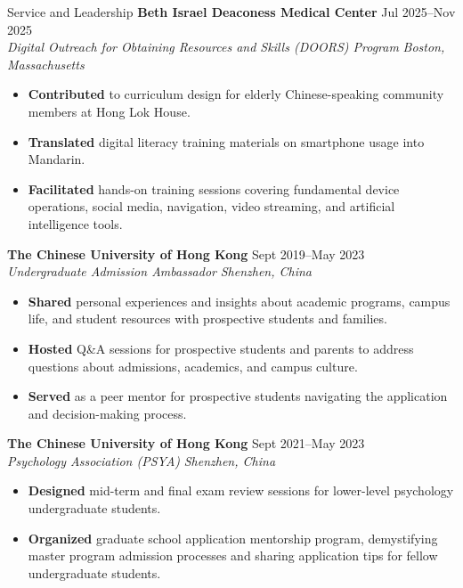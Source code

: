\documentclass{resume} %
\begin{document}
\begin{rSection}{Service and Leadership}
\textbf{Beth Israel Deaconess Medical Center} \hfill {Jul 2025--Nov 2025} \\
\textit{Digital Outreach for Obtaining Resources and Skills (DOORS) Program} \hfill{\textit{Boston, Massachusetts}}
\begin{itemize}
    \itemsep -5pt {}
    \item \textbf{Contributed} to curriculum design for elderly Chinese-speaking community members at Hong Lok House. 
    \item \textbf{Translated} digital literacy training materials on smartphone usage into Mandarin.
    \item \textbf{Facilitated} hands-on training sessions covering fundamental device operations, social media, navigation, video streaming, and artificial intelligence tools. 
\end{itemize}

\textbf{The Chinese University of Hong Kong} \hfill {Sept 2019--May 2023} \\
\textit{Undergraduate Admission Ambassador} \hfill{\textit{Shenzhen, China}}
\begin{itemize}
    \itemsep -5pt {}
    \item \textbf{Shared} personal experiences and insights about academic programs, campus life, and student resources with prospective students and families.
    \item \textbf{Hosted} Q\&A sessions for prospective students and parents to address questions about admissions, academics, and campus culture.
    \item \textbf{Served} as a peer mentor for prospective students navigating the application and decision-making process. 
\end{itemize}

\textbf{The Chinese University of Hong Kong} \hfill {Sept 2021--May 2023} \\
\textit{Psychology Association (PSYA)} \hfill{\textit{Shenzhen, China}}
\begin{itemize}
    \itemsep -5pt {}
    \item \textbf{Designed} mid-term and final exam review sessions for lower-level psychology undergraduate students.
    \item \textbf{Organized} graduate school application mentorship program, demystifying master program admission processes and sharing application tips for fellow undergraduate students.
\end{itemize}

\end{rSection}
\end{document}
